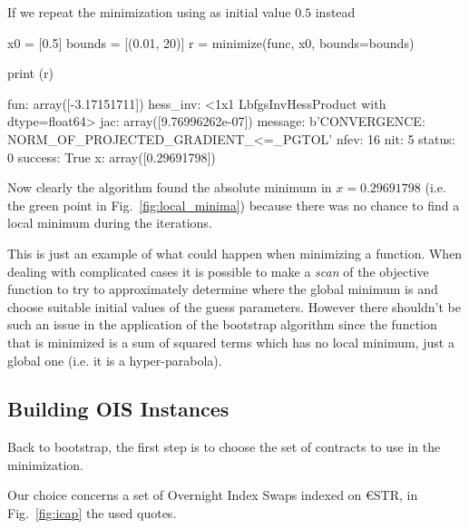 If we repeat the minimization using as initial value $0.5$ instead
\begin{ipythonnon}
x0 = [0.5]
bounds = [(0.01, 20)]
r = minimize(func, x0, bounds=bounds)

print (r)
\end{ipythonnon}
\begin{ioutput}
     fun: array([-3.17151711])
hess_inv: <1x1 LbfgsInvHessProduct with dtype=float64>
     jac: array([9.76996262e-07])
 message: b'CONVERGENCE: NORM_OF_PROJECTED_GRADIENT_<=_PGTOL'
    nfev: 16
     nit: 5
  status: 0
 success: True
       x: array([0.29691798])
\end{ioutput}
Now clearly the algorithm found the absolute minimum in $x=0.29691798$ (i.e. the green point in Fig.~\ref{fig:local_minima}) because there was no chance to find a local minimum during the iterations.

This is just an example of what could happen when minimizing a function. When dealing with complicated cases it is possible to make a \emph{scan} of the objective function to try to approximately determine where the global minimum is and choose suitable initial values of the guess parameters.
However there shouldn't be such an issue in the application of the bootstrap algorithm since the function that is minimized is a sum of squared terms which has no local minimum, just a global one (i.e. it is a hyper-parabola).

\subsection{Building OIS Instances}
\label{building-ois-instances}

Back to bootstrap, the first step is to choose the set of contracts to use in the minimization.


Our choice concerns a set of Overnight Index Swaps indexed on \euro STR, in Fig.~\ref{fig:icap} the used quotes.
 
